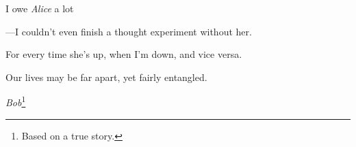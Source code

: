 \cleardoublepage
  \thispagestyle{empty}
  \begin{savenotes}
    \epigraph{
      I owe \emph{Alice} a lot
      
      ---I couldn't even
      finish a thought experiment without her.

      For every time she's up,
      when I'm down,
      and vice versa.

      Our lives may be far apart, yet fairly entangled.
    }{
      \emph{Bob}\footnote{ Based on a true story. }
    }
  \end{savenotes}
\clearpage
